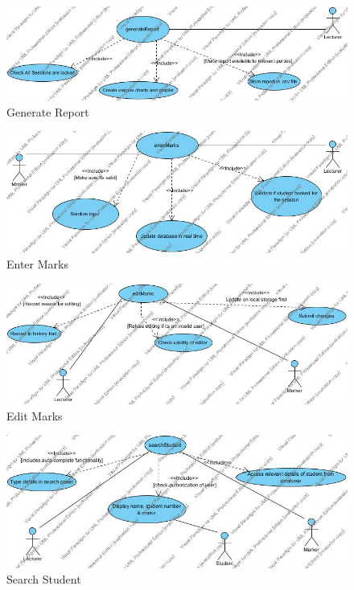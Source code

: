 \documentclass[a4paper]{article}
\begin{document}
			\begin{figure}[H]
				\centering
				\includegraphics[width=1\textwidth]{generateReport}
				\caption{Generate Report}
			\end{figure}
			\begin{figure}[H]
				\centering
				\includegraphics[width=1\textwidth]{enterMarks}
				\caption{Enter Marks}
			\end{figure}
			\begin{figure}[H]
				\centering
				\includegraphics[width=1\textwidth]{editMarks}
				\caption{Edit Marks}
			\end{figure}
			\begin{figure}[H]
				\centering
				\includegraphics[width=1\textwidth]{searchStudent}
				\caption{Search Student}
			\end{figure}
\end{document}
